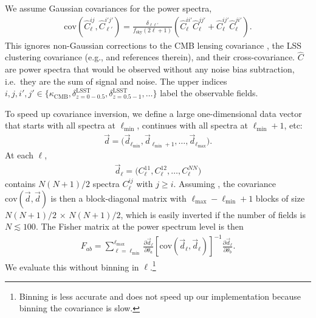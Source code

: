 \documentclass[prd,superscriptaddress,floatfix,notitlepage,nofootinbib,reprint]{revtex4-1} %
\begin{document}
We assume Gaussian covariances for the power spectra,
\begin{align}
  \label{eq:GaussianCov}
  \mathrm{cov}(\hat C^{ij}_{\ell},\hat C^{i'j'}_{\ell'})=
\frac{\delta_{\ell\ell'}}{f_\mathrm{sky}(2\ell+1)}\left(
\hat C^{ii'}_{\ell}\hat C^{jj'}_{\ell}
+\hat C^{ij'}_{\ell}\hat C^{ji'}_{\ell}
\right).
\end{align}
This ignores non-Gaussian corrections to the CMB lensing covariance \cite{Marcel1308,Peloton1611,Motloch1612}, the LSS clustering covariance (e.g., \cite{Li:2014sga,Krause:2016jvl,Barreira:2017kxd} and references therein), and their cross-covariance.
$\hat C$ are power spectra that would be observed without any noise bias subtraction, i.e.~they are the sum of signal and noise.
The upper indices $i,j,i',j'\in\{\kappa_\mathrm{CMB},\delta^\mathrm{LSST}_{z=0-0.5}, \delta^\mathrm{LSST}_{z=0.5-1}, \dots\}$ label the observable fields.


To speed up covariance inversion, we define a large one-dimensional data vector that starts with all spectra at $\ell_\mathrm{min}$, continues with all spectra at $\ell_\mathrm{min}+1$, etc:
\begin{align}
  \label{eq:36}
  \vec d = \big(\vec d_{\ell_\mathrm{min}}, \vec d_{\ell_\mathrm{min}+1}, \dots,
\vec d_{\ell_\mathrm{max}}\big).
\end{align}
At each $\ell$,
\begin{align}
  \label{eq:39}
  \vec d_\ell = \big(
C^{11}_\ell, C^{12}_\ell, \dots, C^{NN}_\ell
\big)
\end{align}
contains $N(N+1)/2$ spectra $C_\ell^{ij}$ with $j\ge i$.
Assuming , the covariance $\mathrm{cov}(\vec d,\vec d)$ is then a block-diagonal matrix with $\ell_\mathrm{max}-\ell_\mathrm{min}+1$ blocks of size $N(N+1)/2$ $\times$ $N(N+1)/2$, which is easily inverted if the number of fields is $N\lesssim 100$.
The Fisher matrix at the power spectrum level is then
\begin{align}
  \label{eq:FisherFast}
  F_{ab} = \sum_{\ell=\ell_\mathrm{min}}^{\ell_\mathrm{max}} \frac{\partial\vec d_\ell}{\partial\theta_a}
[\mathrm{cov}(\vec d_\ell,\vec d_\ell)]^{-1}
\frac{\partial\vec d_\ell}{\partial\theta_b}.
\end{align}
We evaluate this without binning in $\ell$.\footnote{Binning is less accurate and does not speed up our implementation because binning the covariance is slow.}
\end{document}
